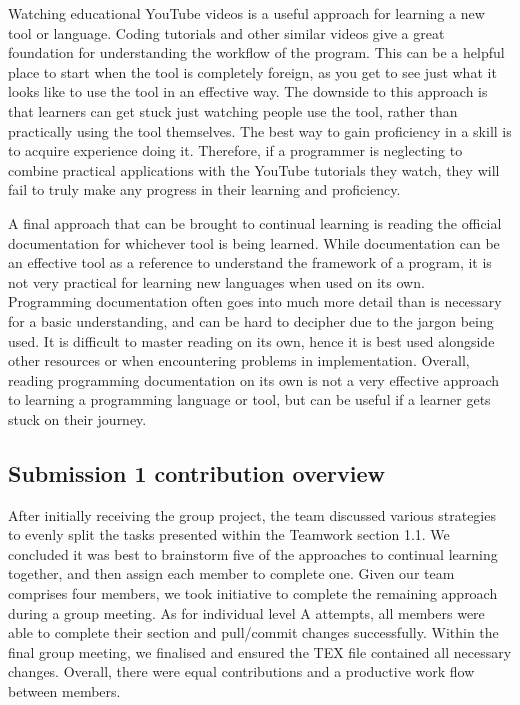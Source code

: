 \documentclass[a4paper, 11pt]{report}
\begin{document}
Watching educational YouTube videos is a useful approach for learning a new tool or language. Coding tutorials and other similar videos give a great foundation for understanding the workflow of the program. This can be a helpful place to start when the tool is completely foreign, as you get to see just what it looks like to use the tool in an effective way. The downside to this approach is that learners can get stuck just watching people use the tool, rather than practically using the tool themselves. The best way to gain proficiency in a skill is to acquire experience doing it. Therefore, if a programmer is neglecting to combine practical applications with the YouTube tutorials they watch, they will fail to truly make any progress in their learning and proficiency.

A final approach that can be brought to continual learning is reading the official documentation for whichever tool is being learned. While documentation can be an effective tool as a reference to understand the framework of a program, it is not very practical for learning new languages when used on its own. Programming documentation often goes into much more detail than is necessary for a basic understanding, and can be hard to decipher due to the jargon being used. It is difficult to master reading on its own, hence it is best used alongside other resources or when encountering problems in implementation. Overall, reading programming documentation on its own is not a very effective approach to learning a programming language or tool, but can be useful if a learner gets stuck on their journey.


\subsection{Submission 1 contribution overview}

After initially receiving the group project, the team discussed various strategies to evenly split the tasks presented within the Teamwork section 1.1. We concluded it was best to brainstorm five of the approaches to continual learning together, and then assign each member to complete one. Given our team comprises four members, we took initiative to complete the remaining approach during a group meeting. As for individual level A attempts, all members were able to complete their section and pull/commit changes successfully. Within the final group meeting, we finalised and ensured the TEX file contained all necessary changes. Overall, there were equal contributions and a productive work flow between members.
\end{document}
